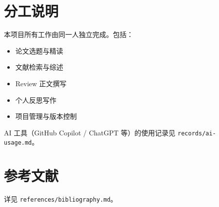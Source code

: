 \documentclass[12pt,a4paper]{article}
\begin{document}
\section{分工说明}

本项目所有工作由同一人独立完成。包括：

\begin{itemize}
    \item 论文选题与精读
    \item 文献检索与综述
    \item Review 正文撰写
    \item 个人反思写作
    \item 项目管理与版本控制
\end{itemize}

AI 工具（GitHub Copilot / ChatGPT 等）的使用记录见 \texttt{records/ai-usage.md}。

\section{参考文献}

详见 \texttt{references/bibliography.md}。

\end{document}
